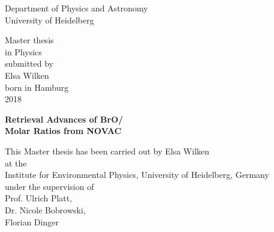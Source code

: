 
\thispagestyle{empty}
\begin{center}
  \renewcommand{\baselinestretch}{2.00}
  \Large\sffamily
  Department of Physics and Astronomy\\
  \large University of Heidelberg
  \par\vfill\normalfont
  Master thesis\\
  in Physics\\
  submitted by\\
  Elsa  Wilken\\
  born in Hamburg\\
  2018
\end{center}
\newpage
\thispagestyle{empty}
\begin{center}
  \renewcommand{\baselinestretch}{2.00}
  \Large\bfseries\sffamily
    Retrieval Advances of BrO/              \\
    Molar Ratios from NOVAC\\
  \par
  \vfill
  \large\normalfont
  This Master thesis has been carried out by Elsa Wilken\\
  at the\\
  Institute for Environmental Physics, University of Heidelberg, Germany\\
  under the supervision of\\
  Prof. Ulrich Platt,\\
  Dr. Nicole Bobrowski,\\
  Florian Dinger
\end{center}\par
\vspace{5\baselineskip}

\renewcommand{\baselinestretch}{1.00}\normalsize